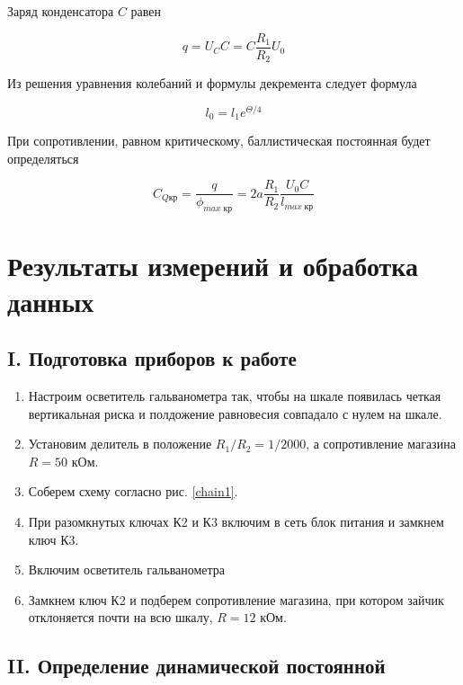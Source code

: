 \documentclass[a4paper,12pt]{article}
\begin{document}
 Заряд конденсатора $ C $ равен 
 
 \begin{equation}\label{}
 q = U_C C = C \dfrac{R_1}{R_2}U_0
 \end{equation}
 
 Из решения уравнения колебаний и формулы декремента следует формула 
 
 \begin{equation}\label{}
 l_0 = l_1 e^{\Theta/4}
 \end{equation}
 
 При сопротивлении, равном критическому, баллистическая постоянная будет определяться
 
 \begin{equation}
 C_{Q кр} = \dfrac{q}{\phi_{max \; кр}} = 2a\dfrac{R_1}{R_2}\dfrac{U_0C}{l_{max \; кр}}
 \label{C}
 \end{equation}

\section{Результаты измерений и обработка данных}

\subsection*{I. Подготовка приборов к работе}

\begin{enumerate}
    \item Настроим осветитель гальванометра так, чтобы на шкале появилась четкая вертикальная риска и полдожение равновесия совпадало с нулем на шкале.
    \item Установим делитель в положение $R_1/R_2 = 1/2000$, а сопротивление магазина $R = 50$ кОм.
    \item Соберем схему согласно рис. \ref{chain1}.
    \item При разомкнутых ключах К2 и К3 включим в сеть блок питания и замкнем ключ К3.
    \item Включим осветитель гальванометра
    \item Замкнем ключ К2 и подберем сопротивление магазина, при котором зайчик отклоняется почти на всю шкалу, $R = 12$ кОм.
\end{enumerate}

\subsection*{II. Определение динамической постоянной}
\end{document}
